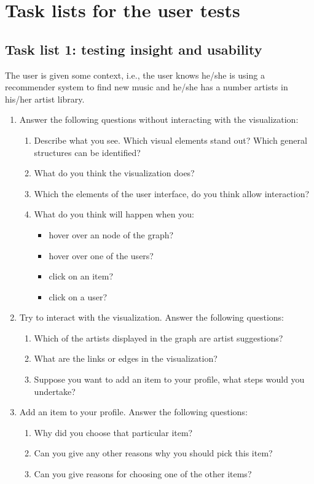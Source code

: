 \chapter{Task lists for the user tests}\label{appendix:tasklists}

\section{Task list 1: testing insight and usability}\label{appendix:tasklists:prototype1}

The user is given some context, i.e., the user knows he/she is using a recommender system to find new music and he/she has a number artists in his/her artist library.

\begin{enumerate}
	\item Answer the following questions without interacting with the visualization:
		\begin{enumerate}
			\item Describe what you see. Which visual elements stand out? Which general structures can be identified?
			\item What do you think the visualization does?
			\item Which the elements of the user interface, do you think allow interaction?
			\item What do you think will happen when you:
				\begin{itemize}
					\item hover over an node of the graph?
					\item hover over one of the users?
					\item click on an item?
					\item click on a user?
				\end{itemize}
		\end{enumerate}
	\item Try to interact with the visualization. Answer the following questions:
		\begin{enumerate}
			\item Which of the artists displayed in the graph are artist suggestions?
			\item What are the links or edges in the visualization?
			\item	Suppose you want to add an item to your profile, what steps would you undertake?
		\end{enumerate}
	\item Add an item to your profile. Answer the following questions:
		\begin{enumerate}
			\item Why did you choose that particular item?
			\item Can you give any other reasons why you should pick this item?
			\item Can you give reasons for choosing one of the other items?
		\end{enumerate}
\end{enumerate}



